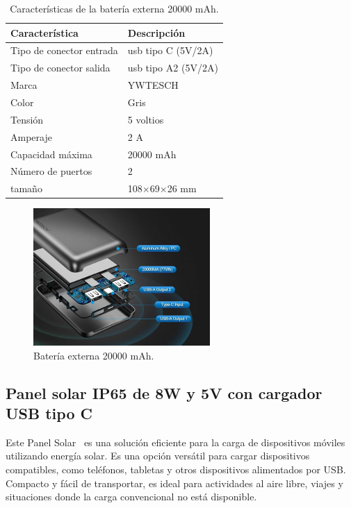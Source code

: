 \begin{table}[htbp]
\begin{center}
\caption{Características de la batería externa 20000 mAh.}
\begin{tabular}{|l|l|}
\hline
\rowcolor[HTML]{C0C0C0} 
\textbf{Característica} & \textbf{Descripción}\\ \hline
Tipo de conector entrada & usb tipo C (5V/2A)\\ \hline
Tipo de conector salida & usb tipo A2 (5V/2A)\\ \hline
Marca & YWTESCH \\ \hline
Color & Gris \\ \hline
Tensión & 5 voltios \\ \hline
Amperaje & 2 A \\ \hline
Capacidad máxima & 20000 mAh \\ \hline
Número de puertos & 2 \\ \hline
tamaño & 108$\times$69$\times$26 mm \\ \hline
\end{tabular}
\end{center}
\end{table}

\begin{figure}[h]
    \centering
    \includegraphics[width=0.6\textwidth]{img/herramientas/bateria_externa_descripcion.png}
    \caption{Batería externa 20000 mAh.} \label{Img:BateriaExterna}
\end{figure}

\subsection{Panel solar IP65 de 8W y 5V con cargador USB tipo C}
Este Panel Solar~\cite{misc:PanelSolar} es una solución eficiente para la carga de dispositivos móviles utilizando energía solar. Es una opción versátil para cargar dispositivos compatibles, como teléfonos, tabletas y otros dispositivos alimentados por USB. Compacto y fácil de transportar, es ideal para actividades al aire libre, viajes y situaciones donde la carga convencional no está disponible.

